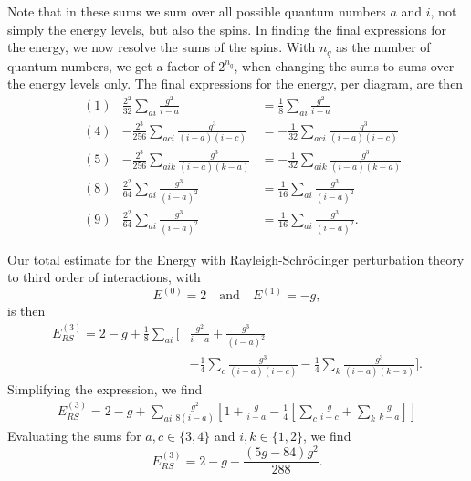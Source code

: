 Note that in these sums we sum over all possible quantum numbers $a$ and $i$, not simply the energy levels, but also the spins.
In finding the final expressions for the energy, we now resolve the sums of the spins.
With $n_q$ as the number of quantum numbers, we get a factor of $2^{n_q}$, when changing the sums to sums over the energy levels only.
The final expressions for the energy, per diagram, are then
\begin{align*}
    & (1) & \frac{2^2}{32} \sum_{ai} \frac{g^2}{i - a} &= \frac{1}{8} \sum_{ai} \frac{g^2}{i - a} \\
    & (4) & -\frac{2^3}{256} \sum_{aci} \frac{g^3}{(i-a)(i-c)} &= -\frac{1}{32} \sum_{aci} \frac{g^3}{(i-a)(i-c)} \\
    & (5) & -\frac{2^3}{256} \sum_{aik} \frac{g^3}{(i-a)(k-a)} &= -\frac{1}{32} \sum_{aik} \frac{g^3}{(i-a)(k-a)} \\
    & (8) & \frac{2^2}{64} \sum_{ai} \frac{g^3}{(i - a)^2} &= \frac{1}{16} \sum_{ai} \frac{g^3}{(i - a)^2} \\
    & (9) & \frac{2^2}{64} \sum_{ai} \frac{g^3}{(i - a)^2} &= \frac{1}{16} \sum_{ai} \frac{g^3}{(i - a)^2}.
\end{align*}

Our total estimate for the Energy with Rayleigh-Schr\"odinger perturbation theory to third order of interactions, with
\begin{equation*}
    E^{(0)} = 2 \quad \text{and} \quad E^{(1)} = - g,
\end{equation*}
is then
\begin{align*}
    E_{RS}^{(3)} = 2 - g + \frac{1}{8} \sum_{ai} \Bigg[
        & \frac{g^2}{i - a} + \frac{g^3}{(i - a)^2} \\
        & - \frac{1}{4} \sum_{c} \frac{g^3}{(i - a)(i - c)}
        - \frac{1}{4} \sum_{k} \frac{g^3}{(i - a)(k - a)}
    \Bigg].
\end{align*}
Simplifying the expression, we find
\begin{align*}
    E_{RS}^{(3)} = 2 - g + \sum_{ai} \frac{g^2}{8(i-a)} \left[
        1 + \frac{g}{i-a} - \frac{1}{4} \left[ \sum_c \frac{g}{i-c} + \sum_k \frac{g}{k-a} \right]
    \right]
\end{align*}
Evaluating the sums for $a,c \in \{3, 4\}$ and $i,k \in \{1, 2\}$, we find
\begin{equation*}
    E_{RS}^{(3)} = 2 - g + \frac{(5g - 84)g^2}{288}.
\end{equation*}
